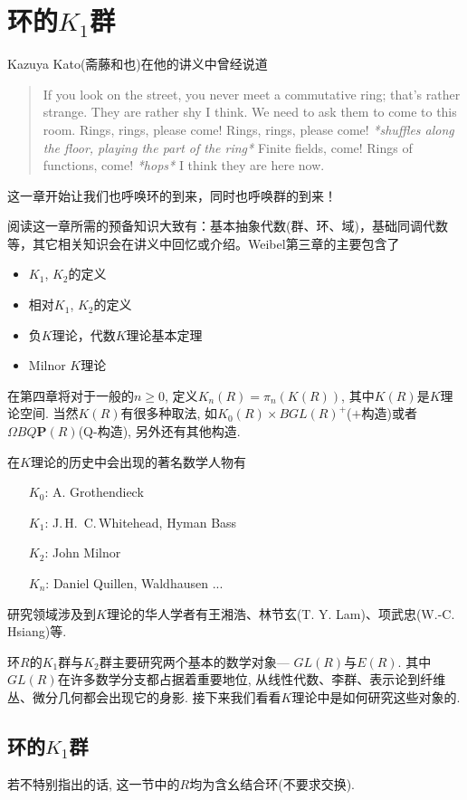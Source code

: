 \chapter{环的$K_1$群}
Kazuya Kato(斋藤和也)在他的讲义中曾经说道
\begin{quote}
	If you look on the street, you never meet a commutative ring; that's rather strange. They are rather shy I think. We need to ask them to come to this room. Rings, rings, please come! Rings, rings, please come! \emph{*shuffles along the floor, playing the part of the ring*} Finite fields, come! Rings of functions, come! \emph{*hops*} I think they are here now. 
\end{quote}

这一章开始让我们也呼唤环的到来，同时也呼唤群的到来！

阅读这一章所需的预备知识大致有：基本抽象代数(群、环、域)，基础同调代数等，其它相关知识会在讲义中回忆或介绍。Weibel\cite{weibel2013k}第三章的主要包含了
\begin{itemize}
	\item $K_1$, $K_2$的定义
	\item 相对$K_1$, $K_2$的定义
	\item 负$K$理论，代数$K$理论基本定理
	\item Milnor $K$理论
\end{itemize}

在第四章将对于一般的$n\geq 0$, 定义$K_n(R)=\pi_n(K(R))$, 其中$K(R)$是$K$理论空间. 当然$K(R)$有很多种取法, 如$K_0(R)\times BGL(R)^+$($+$构造)或者$\Omega BQ\mathbf{P}(R)$(Q-构造), 另外还有其他构造.

在$K$理论的历史中会出现的著名数学人物有
\begin{itemize}
	\item[$K_0$:] A. Grothendieck
	\item[$K_1$:] J.\,H.\, C.\,Whitehead, Hyman Bass 
	\item[$K_2$:] John Milnor
	\item[$K_n$:] Daniel Quillen, Waldhausen ...
\end{itemize}
研究领域涉及到$K$理论的华人学者有王湘浩、林节玄(T. Y. Lam)、项武忠(W.-C. Hsiang)等.

环$R$的$K_1$群与$K_2$群主要研究两个基本的数学对象--- $GL(R)$与$E(R)$. 其中$GL(R)$在许多数学分支都占据着重要地位, 从线性代数、李群、表示论到纤维丛、微分几何都会出现它的身影. 接下来我们看看$K$理论中是如何研究这些对象的.
\section{环的$K_1$群}
若不特别指出的话, 这一节中的$R$均为含幺结合环(不要求交换).

